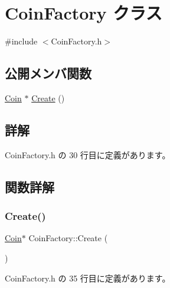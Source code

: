 \hypertarget{class_coin_factory}{}\section{Coin\+Factory クラス}
\label{class_coin_factory}


{\ttfamily \#include $<$Coin\+Factory.\+h$>$}

\subsection*{公開メンバ関数}
\begin{DoxyCompactItemize}
\item 
\mbox{\hyperlink{class_coin}{Coin}} $\ast$ \mbox{\hyperlink{class_coin_factory_a0d2390aa7215c9802edabfe11ab62006}{Create}} ()
\end{DoxyCompactItemize}


\subsection{詳解}


 Coin\+Factory.\+h の 30 行目に定義があります。



\subsection{関数詳解}
\mbox{\label{class_coin_factory_a0d2390aa7215c9802edabfe11ab62006}} 
\subsubsection{\texorpdfstring{Create()}{Create()}}
{\footnotesize\ttfamily \mbox{\hyperlink{class_coin}{Coin}}$\ast$ Coin\+Factory\+::\+Create (\begin{DoxyParamCaption}{ }\end{DoxyParamCaption})\hspace{0.3cm}{\ttfamily [inline]}}



 Coin\+Factory.\+h の 35 行目に定義があります。

